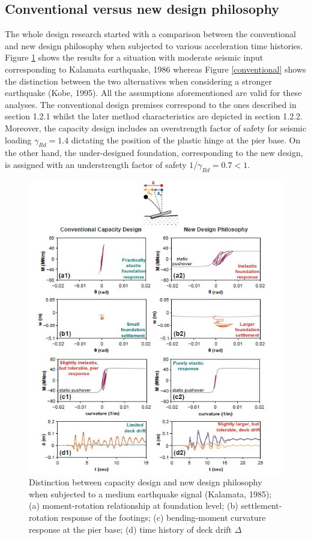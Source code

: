 \documentclass[12pt,a4paper]{report}
\begin{document}
\subsection{Conventional versus new design philosophy}
The whole design research started with a comparison between the conventional and new design philosophy when subjected to various acceleration time histories. Figure \ref{conventional2} shows the results for a situation with moderate seismic input corresponding to Kalamata earthquake, 1986 whereas Figure \ref{conventional} shows the distinction between the two alternatives when considering a stronger earthquake (Kobe, 1995). All the assumptions aforementioned are valid for these analyses. The conventional design premises correspond to the ones described in section 1.2.1 whilst the later method characteristics are depicted in section 1.2.2. Moreover, the capacity design includes an overstrength factor of safety for seismic loading $\gamma_{Rd}=1.4$ dictating the position of the plastic hinge at the pier base. On the other hand, the under-designed foundation, corresponding to the new design, is assigned with an understrength factor of safety $1/\gamma_{Rd}=0.7 <1$. 

\begin{figure}[h!]
	\centering
	\includegraphics[width=0.8\linewidth]{"conven2"}
	\caption{Distinction between capacity design and new design philosophy when subjected to a medium earthquake signal (Kalamata, 1985); (a) moment-rotation relationship at foundation level; (b) settlement-rotation response of the footings; (c) bending-moment curvature response at the pier base; (d) time history of deck drift $\Delta$}
	\label{conventional2}
\end{figure}
\end{document}
